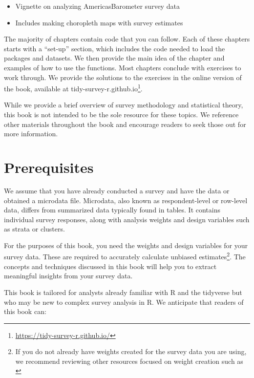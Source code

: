 \documentclass[
]{krantz}
\providecommand{\tightlist}{%
  \setlength{\itemsep}{0pt}\setlength{\parskip}{0pt}}
\renewcommand{\href}[2]{#2\footnote{\url{#1}}}
\begin{document}
\begin{itemize}
  \begin{itemize}
  \tightlist
  \item
    Vignette on analyzing AmericasBarometer survey data
  \item
    Includes making choropleth maps with survey estimates
  \end{itemize}
\end{itemize}

The majority of chapters contain code that you can follow. Each of these chapters starts with a ``set-up'' section, which includes the code needed to load the packages and datasets. We then provide the main idea of the chapter and examples of how to use the functions. Most chapters conclude with exercises to work through. We provide the solutions to the exercises in the online version of the book, available at \href{https://tidy-survey-r.github.io/}{tidy-survey-r.github.io}.

While we provide a brief overview of survey methodology and statistical theory, this book is not intended to be the sole resource for these topics. We reference other materials throughout the book and encourage readers to seek those out for more information.

\hypertarget{prerequisites}{%
\section{Prerequisites}\label{prerequisites}}

We assume that you have already conducted a survey and have the data or obtained a microdata file. Microdata, also known as respondent-level or row-level data, differs from summarized data typically found in tables. It contains individual survey responses, along with analysis weights and design variables such as strata or clusters.

For the purposes of this book, you need the weights and design variables for your survey data. These are required to accurately calculate unbiased estimates\footnote{If you do not already have weights created for the survey data you are using, we recommend reviewing other resources focused on weight creation such as \citet{Valliant2018weights}}. The concepts and techniques discussed in this book will help you to extract meaningful insights from your survey data.

This book is tailored for analysts already familiar with R and the tidyverse but who may be new to complex survey analysis in R. We anticipate that readers of this book can:
\end{document}
